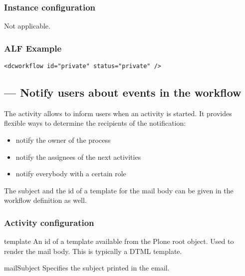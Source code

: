   \subsubsection{Instance configuration}
 
  Not applicable.
     
  \subsubsection{ALF Example}

\begin{verbatim}
<dcworkflow id="private" status="private" />
\end{verbatim}
  
 \subsection{ --- Notify users about events in the workflow}
 
  
 The  activity allows to inform users when an activity is
 started. It provides flexible ways to determine the recipients of the
 notification:

 \begin{itemize}
     \item notify the owner of the process
     \item notify the assignees of the next activities
     \item notify everybody with a certain role
 \end{itemize}

 The subject and the id of a template for the mail body can be given in the
 workflow definition as well.
 
 \subsubsection{Activity configuration}

    \begin{memberdesc}{template}
        An id of a template available from the Plone root object. Used to render the mail body. This
        is typically a DTML template.
    \end{memberdesc}

    \begin{memberdesc}{mailSubject}
        Specifies the subject printed in the email.
    \end{memberdesc}

